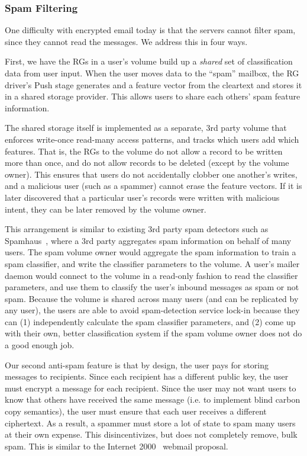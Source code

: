 \subsubsection{Spam Filtering}

One difficulty with encrypted email today is that the servers cannot filter spam,
since they cannot read the messages.  We address this in four ways.

First, we have the RGs in a user's volume build
up a \emph{shared} set of classification data from user input.  When the user
moves data to the ``spam'' mailbox, the RG driver's Push stage generates and
a feature vector from the cleartext and stores it in a shared storage
provider.  This allows
users to share each others' spam feature information.

The shared storage itself is implemented as a separate, 3rd party volume that enforces write-once read-many
access patterns, and tracks which users add which features.  That is, the RGs to the volume do not allow a record to be
written more than once, and do not allow records to be deleted (except by the
volume owner).  This ensures
that users do not accidentally clobber one another's writes, and a malicious
user (such as a spammer) cannot erase the feature vectors.  If it is later
discovered that a particular user's records were written with malicious intent,
they can be later removed by the volume owner.

This arrangement is similar to existing 3rd party spam detectors such as
Spamhaus~\cite{spamhaus}, where a 3rd party aggregates spam information 
on behalf of many users.  The spam volume owner would aggregate the spam
information to train a spam classifier, and write the classifier parameters
to the volume.  A user's mailer daemon would connect to the volume in a read-only fashion
to read the classifier parameters, and use them to classify the user's inbound
messages as spam or not spam.  Because the volume is shared across many users
(and can be replicated by any user), the users are able to avoid spam-detection
service lock-in because they can (1) independently calculate the spam classifier
parameters, and (2) come up with their own, better classification system if the
spam volume owner does not do a good enough job.

Our second anti-spam feature is that by design, the user pays for storing messages to recipients.  Since each
recipient has a different public key, the user must encrypt a message for each
recipient.  Since the user may not want users to know that others have received
the same message (i.e. to implement blind carbon copy semantics), the user must
ensure that each user receives a different ciphertext.  As a result, a spammer
must store a lot of state to spam many users at their own expense.  This
disincentivizes, but does not completely remove, bulk spam.  This is similar to
the Internet 2000~\cite{internet2000} webmail proposal.

